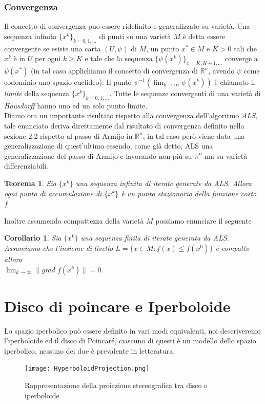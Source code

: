 \documentclass[a4paper, 12pt]{article}
\newtheorem{theorem}{Teorema}
\newtheorem{corollary}{Corollario}
\begin{document}
\subsubsection{Convergenza}
Il concetto di convergenza puo essere ridefinito e generalizzato su varietà. Una sequenza infinita $\{x^k\}_{k=0,1,...}$ di punti su una varietà $M$ è detta essere convergente se esiste una carta $(U, \psi)$ di $M$, un punto $x^\ast \in M$ e $K > 0$ tali che $x^k$ è in $U$ per ogni $k \geq K$ e tale che la sequenza $\{\psi(x^k)\}_{x=K, K+1, ...}$ converge a $\psi(x^\ast)$ (in tal caso applichiamo il concetto di convergenza di $\mathbb{R}^n$, avendo $\psi$ come codominio uno spazio euclideo). Il punto $\psi^{-1}(\lim_{k \to \infty} \psi(x^k))$ è chiamato il \emph{limite} della sequenza $\{x^k\}_{k=0,1,...}$. Tutte le sequenze convergenti di una varietà di \emph{Hausdorff} hanno uno ed un solo punto limite.\\
Diamo ora un importante risultato rispetto alla convergenza dell'algoritmo \emph{ALS}, tale enunciato deriva direttamente dal risultato di convergenza definito nella sezione 2.2 rispetto al passo di Armijo in $\mathbb{R}^n$, in tal caso però viene data una generalizzazione di quest'ultimo essendo, come già detto, ALS una generalizzazione del passo di Armijo e lavorando non più su $\mathbb{R}^n$ ma su varietà differenziabili.
\begin{theorem}
Sia $\{x^k\}$ una sequenza infinita di iterate generate da ALS. Allora ogni punto di accumulazione  di $\{x^k\}$ è un punto stazionario della funzione costo $f$
\end{theorem}
Inoltre assumendo compattezza della varietà $M$ possiamo enunciare il seguente
\begin{corollary}
Sia $\{x^k\}$ una sequenza finita di iterate generata da ALS. Assumiamo che l'insieme di livello $L = \{x \in M : f(x) \leq f(x^0)\}$ è compatto allora\\ $\lim_{k \to \infty} \parallel $grad $f(x^k) \parallel = 0$.
\end{corollary}

\section{Disco di poincare e Iperboloide}
Lo spazio iperbolico può essere definito in vari modi equivalenti, noi descriveremo l'iperboloide ed il disco di Poincaré, ciascuno di questi è un modello dello spazio iperbolico, nessuno dei due è prevalente in letteratura.\\
\begin{figure}[t] %
    \centering\texttt{[image: HyperboloidProjection.png]}
    \caption{Rappresentazione della proiezione stereografica tra disco e iperboloide}
\end{figure}
\end{document}
